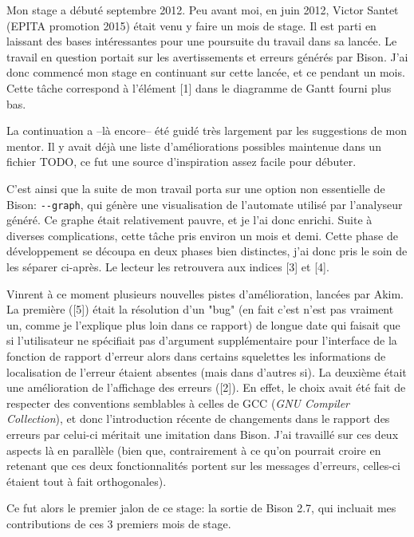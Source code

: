 \documentclass[a4paper,11pt,twoside,final]{article}
\begin{document}
  Mon stage a débuté septembre 2012. Peu avant moi, en juin 2012, Victor
  Santet (EPITA promotion 2015) était venu y faire un mois de stage. Il est
  parti en laissant des bases intéressantes pour une poursuite du travail dans
  sa lancée. Le travail en question portait sur les avertissements et erreurs
  générés par Bison. J'ai donc commencé mon stage en continuant sur cette
  lancée, et ce pendant un mois. Cette tâche correspond à l'élément [1] dans le
  diagramme de Gantt fourni plus bas.

  La continuation a --là encore-- été guidé très largement par les suggestions
  de mon mentor.  Il y avait déjà une liste d'améliorations possibles maintenue
  dans un fichier TODO, ce fut une source d'inspiration assez facile pour
  débuter.

  C'est ainsi que la suite de mon travail porta sur une option non essentielle
  de Bison: \texttt{-{}-graph}, qui génère une visualisation de l'automate utilisé
  par l'analyseur généré. Ce graphe était relativement pauvre, et je l'ai donc
  enrichi. Suite à diverses complications, cette tâche pris environ un mois et
  demi. Cette phase de développement se découpa en deux phases bien distinctes,
  j'ai donc pris le soin de les séparer ci-après. Le lecteur les retrouvera aux
  indices [3] et [4].

  Vinrent à ce moment plusieurs nouvelles pistes d'amélioration, lancées par
  Akim. La première ([5]) était la résolution d'un "bug" (en fait c'est n'est
  pas vraiment un, comme je l'explique plus loin dans ce rapport) de longue
  date qui faisait que si l'utilisateur ne spécifiait pas d'argument
  supplémentaire pour l'interface de la fonction de rapport d'erreur alors dans
  certains squelettes les informations de localisation de l'erreur étaient
  absentes (mais dans d'autres si). La deuxième était une amélioration de
  l'affichage des erreurs ([2]). En effet, le choix avait été fait de respecter
  des conventions semblables à celles de GCC (\textit{GNU Compiler
  Collection}), et donc l'introduction récente de changements dans le rapport
  des erreurs par celui-ci méritait une imitation dans Bison. J'ai travaillé
  sur ces deux aspects là en parallèle (bien que, contrairement à ce qu'on
  pourrait croire en retenant que ces deux fonctionnalités portent sur les
  messages d'erreurs, celles-ci étaient tout à fait orthogonales).

  Ce fut alors le premier jalon de ce stage: la sortie de Bison 2.7, qui
  incluait mes contributions de ces 3 premiers mois de stage.
\end{document}

